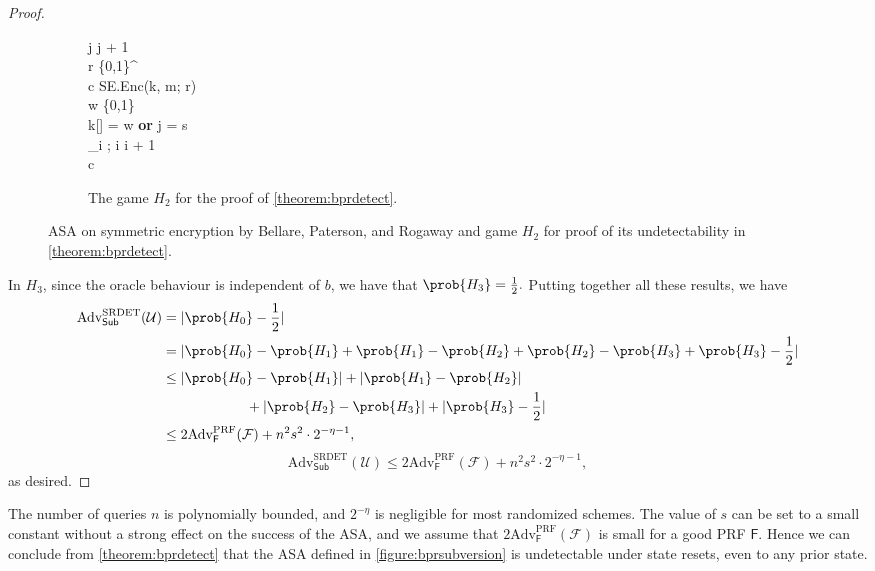 \begin{proof}
\begin{figure}
\begin{subfigure}[t]{0.6\textwidth}
\begin{pchstack}
{	\pcind \pcind j \leftarrow j + 1 \\
	\pcind \pcind r \sample \{0,1\}^ \\
	\pcind \pcind c \leftarrow \textsf{SE.Enc}(k, m; r) \\
	\pcind \pcind w \sample \{0,1\} \\
	\pcind \pcuntil k[\tau] = w \textbf{ or } j = s\\
	\pcind \tau_i \leftarrow \tau; i \leftarrow i + 1 \\
	\pcreturn c
}
\end{pchstack}
\caption{The game $H_2$ for the proof of \autoref{theorem:bprdetect}.}
\label{game:H2}
\end{subfigure}
\caption[ASA on symmetric encryption by Bellare, Paterson, and Rogaway \cite{C:BelPatRog14} and game $H_2$ for proof of its undetectability in \autoref{theorem:bprdetect}]{ASA on symmetric encryption by Bellare, Paterson, and Rogaway \cite{C:BelPatRog14} and game $H_2$ for proof of its undetectability in \autoref{theorem:bprdetect}.}
\end{figure}
 
In $H_3$, since the oracle behaviour is independent of $b$, we have that $\prob{H_3}= \frac{1}{2}.$ Putting together all these results, we have
\iffullversion
\begin{align*}
\text{Adv}^\text{SRDET}_\textsf{Sub}(\mathcal{U})
&= |\prob{H_0}-\frac{1}{2}| \\
&= |\prob{H_0}-\prob{H_1}+\prob{H_1}-\prob{H_2}+\prob{H_2}-\prob{H_3}+\prob{H_3}-\frac{1}{2}| \\
&\le |\prob{H_0}-\prob{H_1}|+|\prob{H_1}-\prob{H_2}| \\
& \qquad\qquad\qquad +|\prob{H_2}-\prob{H_3}|+|\prob{H_3}-\frac{1}{2}| \\
&\le 2\text{Adv}^{\mathrm{PRF}}_\mathsf{F}(\mathcal{F}) + n^2s^2\cdot 2^{-\eta-1},
\end{align*}
\else
\[
\text{Adv}^\text{SRDET}_\textsf{Sub}(\mathcal{U}) \le 2\text{Adv}^{\mathrm{PRF}}_\mathsf{F}(\mathcal{F}) + n^2s^2\cdot 2^{-\eta-1},
\]
\fi
as desired.
\end{proof}

The number of queries $n$ is polynomially bounded, and $2^{-\eta}$ is negligible for most randomized schemes. The value of $s$ can be set to a small constant without a strong effect on the success of the ASA, and we assume that $2\text{Adv}^{\mathrm{PRF}}_\mathsf{F}(\mathcal{F})$ is small for a good PRF $\mathsf{F}$. Hence we can conclude from \autoref{theorem:bprdetect} that the ASA defined in \autoref{figure:bprsubversion} is undetectable under state resets, even to any prior state.

